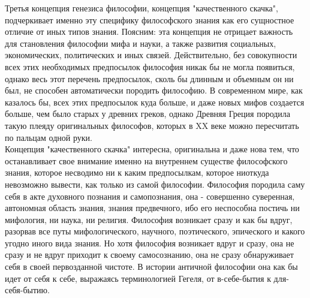 \documentclass[12pt]{article}
\begin{document}
Третья концепция генезиса философии, концепция "качественного скачка", подчеркивает именно эту специфику
философского знания как его сущностное отличие от иных типов знания. Поясним: эта концепция не отрицает
важность для становления философии мифа и науки, а также развития социальных, экономических,
политических и иных связей. Действительно, без совокупности всех этих необходимых предпосылок
философия никак бы не могла появиться, однако весь этот перечень предпосылок, сколь бы длинным и
объемным он ни был, не способен автоматически породить философию. В современном мире, как казалось бы,
всех этих предпосылок куда больше, и даже новых мифов создается больше, чем было старых у древних греков,
однако Древняя Греция породила такую плеяду оригинальных философов, которых в XX веке можно
пересчитать по пальцам одной руки.\\
Концепция "качественного скачка" интересна, оригинальна и даже нова тем, что останавливает свое внимание
именно на внутреннем существе философского знания, которое несводимо ни к каким предпосылкам, которое
ниоткуда невозможно вывести, как только из самой философии. Философия породила саму себя в акте
духовного познания и самопознания, она - совершенно суверенная, автономная область знания, знания
предвечного, ибо его неспособна постичь ни мифология, ни наука, ни религия. Философия возникает сразу и
как бы вдруг, разорвав все путы мифологического, научного, поэтического, эпического и какого угодно иного
вида знания. Но хотя философия возникает вдруг и сразу, она не сразу и не вдруг приходит к своему
самосознанию, она не сразу обнаруживает себя в своей первозданной чистоте. В истории античной философии
она как бы идет от себя к себе, выражаясь терминологией Гегеля, от в-себе-бытия к для-себя-бытию.


\newpage
\end{document}
